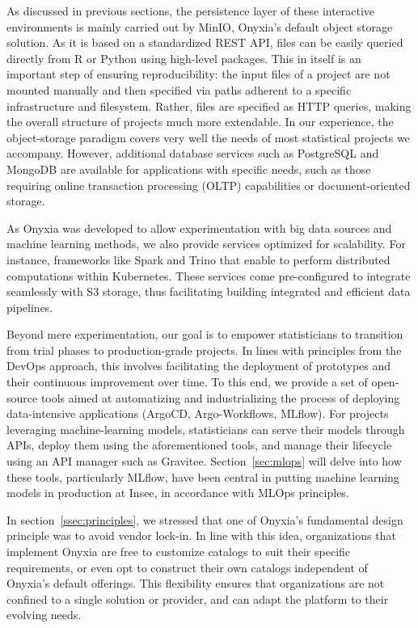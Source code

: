 \documentclass[graybox]{svmult}
\begin{document}
As discussed in previous sections, the persistence layer of these interactive environments is mainly carried out by MinIO, Onyxia's default object storage solution. As it is based on a standardized REST API, files can be easily queried directly from R or Python using high-level packages. This in itself is an important step of ensuring reproducibility: the input files of a project are not mounted manually and then specified via paths adherent to a specific infrastructure and filesystem. Rather, files are specified as HTTP queries, making the overall structure of projects much more extendable. In our experience, the object-storage paradigm covers very well the needs of most statistical projects we accompany. However, additional database services such as PostgreSQL and MongoDB are available for applications with specific needs, such as those requiring online transaction processing (OLTP) capabilities or document-oriented storage.

As Onyxia was developed to allow experimentation with big data sources and machine learning methods, we also provide services optimized for scalability. For instance, frameworks like Spark and Trino that enable to perform distributed computations within Kubernetes. These services come pre-configured to integrate seamlessly with S3 storage, thus facilitating building integrated and efficient data pipelines.

Beyond mere experimentation, our goal is to empower statisticians to transition from trial phases to production-grade projects. In lines with principles from the DevOps approach, this involves facilitating the deployment of prototypes and their continuous improvement over time. To this end, we provide a set of open-source tools aimed at automatizing and industrializing the process of deploying data-intensive applications (ArgoCD, Argo-Workflows, MLflow). For projects leveraging machine-learning models, statisticians can serve their models through APIs, deploy them using the aforementioned tools, and manage their lifecycle using an API manager such as Gravitee. Section~\ref{sec:mlops} will delve into how these tools, particularly MLflow, have been central in putting machine learning models in production at Insee, in accordance with MLOps principles.

In section~\ref{ssec:principles}, we stressed that one of Onyxia's fundamental design principle was to avoid vendor lock-in. In line with this idea, organizations that implement Onyxia are free to customize catalogs to suit their specific requirements, or even opt to construct their own catalogs independent of Onyxia's default offerings. This flexibility ensures that organizations are not confined to a single solution or provider, and can adapt the platform to their evolving needs.
\end{document}
